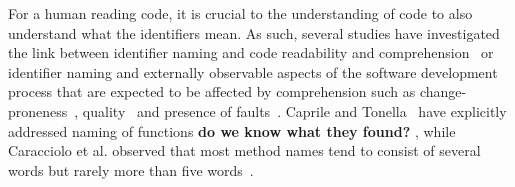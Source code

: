 \documentclass[conference]{IEEEtran}
\newcommand{\todo}[1]{ \textbf{#1} }
\newcommand{\quotes}[1]{\textit{``#1''}}
\begin{document}
For a human reading code, it is crucial to the understanding of code to also understand what the identifiers mean. As such, several studies have investigated the link between identifier naming and code readability and comprehension~\cite{AvidanF17,HofmeisterSH17,LawrieMFB07,TakangGM96,Teasley} or identifier naming and externally observable aspects of the software development process that are expected to be affected by comprehension such as change-proneness~\cite{AmanASK15}, quality~\cite{ButlerWYS10,LunguK13} and presence of faults~\cite{ScannielloR13,TramontanaRS14}.
Caprile and Tonella~\cite{CaprileTonella} have explicitly addressed naming of functions\todo{do we know what they found?}, while Caracciolo et al. observed that most method names tend to consist of several words but rarely more than five words~\cite{Caracciolo}.
%
\end{document}
